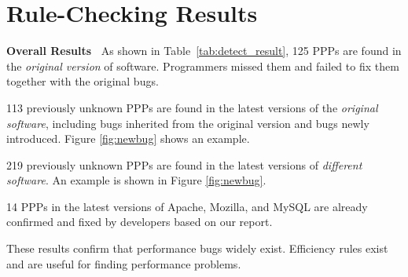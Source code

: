\section{Rule-Checking Results}
\label{sec:detection_results}



{\bf Overall Results\ }
As shown in Table~\ref{tab:detect_result}, 125 PPPs are found in the {\it original 
version} of software.
Programmers missed them and failed to fix them together with the original bugs.

113 previously unknown PPPs are found in the latest versions of the 
{\it original software}, including bugs inherited from the original version
and bugs newly introduced. Figure \ref{fig:newbug} shows an example. 

219 previously unknown PPPs are found in the latest versions of
{\it different software}. An example is shown in Figure \ref{fig:newbug}. 

14 PPPs in the latest versions of Apache, Mozilla, and MySQL
are already confirmed and fixed by developers based on our report.

These results confirm that performance bugs widely 
exist. Efficiency rules exist and are useful for finding
performance problems.


